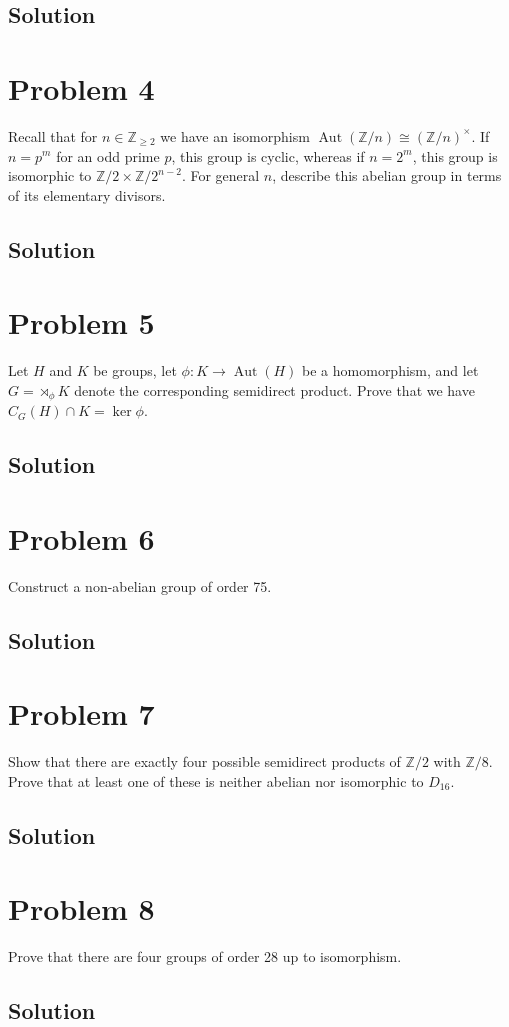 \documentclass[fleqn]{article}
\DeclareMathOperator{\Aut}{Aut}
\begin{document}
        \subsection{Solution}
        
    
    \section{Problem 4}
    Recall that for $n \in \mathbb{Z}_{\geq 2}$ we have an isomorphism $\Aut(\mathbb{Z}/n) \cong (\mathbb{Z}/n)^\times$.  If $n = p^m$ for an odd prime $p$, this group is cyclic, whereas if $n = 2^m$, this group is isomorphic to $\mathbb{Z}/2 \times \mathbb{Z}/2^{n - 2}$.  For general $n$, describe this abelian group in terms of its elementary divisors.
        
        \subsection{Solution}
        
    
    \section{Problem 5}
    Let $H$ and $K$ be groups, let $\phi: K \to \Aut(H)$ be a homomorphism, and let $G = \rtimes_\phi K$ denote the corresponding semidirect product.  Prove that we have $C_G(H) \cap K = \ker \phi$.
        
        \subsection{Solution}
        
    
    \section{Problem 6}
    Construct a non-abelian group of order 75.
        
        \subsection{Solution}
        
    
    \section{Problem 7}
    Show that there are exactly four possible semidirect products of $\mathbb{Z}/2$ with $\mathbb{Z}/8$.  Prove that at least one of these is neither abelian nor isomorphic to $D_{16}$.
        
        \subsection{Solution}
        
    
    \section{Problem 8}
    Prove that there are four groups of order 28 up to isomorphism.
        
        \subsection{Solution}
        
    
\end{document}
